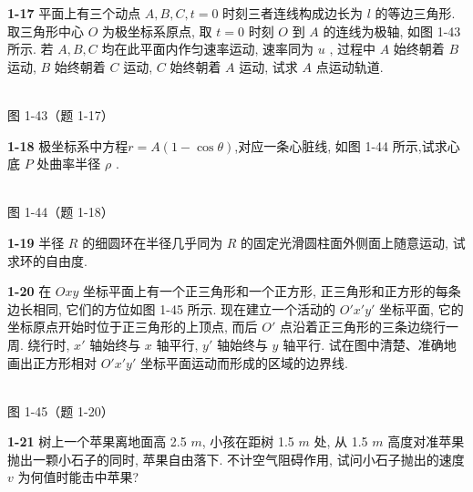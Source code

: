 \newpage

\textbf{1-17} 平面上有三个动点 $A, B, C, t = 0$ 时刻三者连线构成边长为 $l$ 的等边三角形. 取三角形中心 $O$ 为极坐标系原点, 取 $t = 0$ 时刻 $O$ 到 $A$ 的连线为极轴, 如图 1-43 所示. 若 $A, B, C$ 均在此平面内作匀速率运动, 速率同为 $u$ , 过程中 $A$ 始终朝着 $B$ 运动, $B$ 始终朝着 $C$ 运动, $C$ 始终朝着 $A$ 运动, 试求 $A$ 点运动轨道.

\begin{center}
\resizebox{0.40\textwidth}{!}{}\\[4pt]
{\small 图 1-43（题 1-17）}
\end{center}

\newpage

\textbf{1-18} 极坐标系中方程$r = A (1 - \cos \theta)$,对应一条心脏线, 如图 1-44 所示,试求心底 $P$ 处曲率半径 $\rho$ .

\begin{center}
\resizebox{0.36\textwidth}{!}{}\\[4pt]
{\small 图 1-44（题 1-18）}
\end{center}

\newpage

\textbf{1-19} 半径 $R$ 的细圆环在半径几乎同为 $R$ 的固定光滑圆柱面外侧面上随意运动, 试求环的自由度.

\newpage

\textbf{1-20} 在 $Oxy$ 坐标平面上有一个正三角形和一个正方形, 正三角形和正方形的每条边长相同, 它们的方位如图 1-45 所示. 现在建立一个活动的 $O'x'y'$ 坐标平面, 它的坐标原点开始时位于正三角形的上顶点, 而后 $O'$ 点沿着正三角形的三条边绕行一周. 绕行时, $x'$ 轴始终与 $x$ 轴平行, $y'$ 轴始终与 $y$ 轴平行. 试在图中清楚、准确地画出正方形相对 $O'x'y'$ 坐标平面运动而形成的区域的边界线.



\begin{center}
\resizebox{0.36\textwidth}{!}{}\\[4pt]
{\small 图 1-45（题 1-20）}
\end{center}

\newpage

\textbf{1-21} 树上一个苹果离地面高 2.5 $m$, 小孩在距树 1.5 $m$ 处, 从 1.5 $m$ 高度对准苹果抛出一颗小石子的同时, 苹果自由落下. 不计空气阻碍作用, 试问小石子抛出的速度 $v$ 为何值时能击中苹果?

